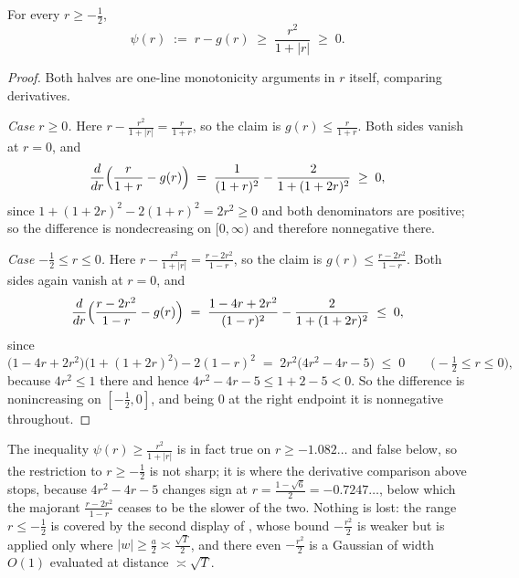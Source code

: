 \begin{lemma}
\label{lem:rs_arctan_sharp}
\leanok
For every $r\ge-\tfrac12$,
\[
  \psi(r)\;:=\;r-g(r)\;\ge\;\frac{r^{2}}{1+\lvert r\rvert}\;\ge\;0 .
\]
\end{lemma}

\begin{proof}
\leanok
Both halves are one-line monotonicity arguments in $r$ itself, comparing derivatives.

\emph{Case $r\ge0$.}  Here $r-\tfrac{r^{2}}{1+\lvert r\rvert}=\tfrac r{1+r}$, so the claim is
$g(r)\le\tfrac r{1+r}$.  Both sides vanish at $r=0$, and
\[
  \frac{d}{dr}\Bigl(\frac r{1+r}-g(r)\Bigr)
  \;=\;\frac1{(1+r)^{2}}-\frac2{1+(1+2r)^{2}}\;\ge\;0 ,
\]
since $1+(1+2r)^{2}-2(1+r)^{2}=2r^{2}\ge0$ and both denominators are positive; so the difference
is nondecreasing on $[0,\infty)$ and therefore nonnegative there.

\emph{Case $-\tfrac12\le r\le0$.}  Here $r-\tfrac{r^{2}}{1+\lvert r\rvert}
=\tfrac{r-2r^{2}}{1-r}$, so the claim is $g(r)\le\tfrac{r-2r^{2}}{1-r}$.  Both sides again vanish
at $r=0$, and
\[
  \frac{d}{dr}\Bigl(\frac{r-2r^{2}}{1-r}-g(r)\Bigr)
  \;=\;\frac{1-4r+2r^{2}}{(1-r)^{2}}-\frac2{1+(1+2r)^{2}}\;\le\;0 ,
\]
since
\[
  \bigl(1-4r+2r^{2}\bigr)\bigl(1+(1+2r)^{2}\bigr)-2(1-r)^{2}
  \;=\;2r^{2}\bigl(4r^{2}-4r-5\bigr)\;\le\;0
  \qquad\bigl(-\tfrac12\le r\le0\bigr),
\]
because $4r^{2}\le1$ there and hence $4r^{2}-4r-5\le1+2-5<0$.  So the difference is nonincreasing
on $[-\tfrac12,0]$, and being $0$ at the right endpoint it is nonnegative throughout.
\end{proof}

\begin{remark}
\label{rem:rs_arctan_sharp_range}
The inequality $\psi(r)\ge\tfrac{r^{2}}{1+\lvert r\rvert}$ is in fact true on
$r\ge-1.082\ldots$ and false below, so the restriction to $r\ge-\tfrac12$ is not sharp; it is
where the derivative comparison above stops, because $4r^{2}-4r-5$ changes sign at $r=\tfrac{1-\sqrt6}2=-0.7247\ldots$,
below which the majorant $\tfrac{r-2r^{2}}{1-r}$ ceases to be the slower of the two.
Nothing is lost: the range $r\le-\tfrac12$ is covered by the second display of
, whose bound $-\tfrac{r^{2}}2$ is weaker but is applied only
where $\lvert w\rvert\ge\tfrac a2\asymp\tfrac{\sqrt T}2$, and there even $-\tfrac{r^{2}}2$ is a
Gaussian of width $O(1)$ evaluated at distance $\asymp\sqrt T$.
\end{remark}

